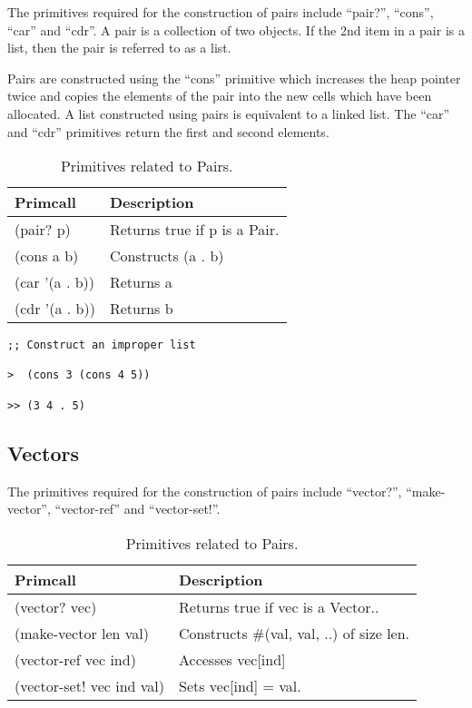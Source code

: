 \documentclass{article}
\begin{document}
The primitives required for the construction of pairs include ``pair?'', ``cons'', ``car'' and ``cdr''. A pair is a collection of two objects. If the 2nd item in a pair is a list, then the pair is referred to as a list.

Pairs are constructed using the ``cons'' primitive which increases the heap pointer twice and copies the elements of the pair into the new cells which have been allocated. A list constructed using pairs is equivalent to a linked list. The ``car'' and ``cdr'' primitives return the first and second elements.

\begin{table}[ht]
  \centering
\begin{tabular}{ l l }
  \toprule
  Primcall & Description \\ \hline
  \midrule
  (pair? p) & Returns true if p is a Pair.   \\
  (cons a b) & Constructs (a . b)  \\
  (car '(a . b)) & Returns a \\
  (cdr '(a . b)) & Returns b \\
  \bottomrule
\end{tabular}
\caption{Primitives related to Pairs.} \label{tab:pairs}
\end{table}

\begin{verbatim}
;; Construct an improper list

>  (cons 3 (cons 4 5))

>> (3 4 . 5)
\end{verbatim}


\subsection{Vectors}

The primitives required for the construction of pairs include ``vector?'', ``make-vector'', ``vector-ref'' and ``vector-set!''.

\begin{table}[ht]
  \centering
\begin{tabular}{ l l }
  \toprule
  Primcall & Description \\ \hline
  \midrule
  (vector? vec) & Returns true if vec is a Vector.. \\
  (make-vector len val) & Constructs \#(val, val, ..) of size len. \\
  (vector-ref vec ind) & Accesses vec[ind] \\
  (vector-set! vec ind val) & Sets vec[ind] = val. \\
  \bottomrule
\end{tabular}
\caption{Primitives related to Pairs.} \label{tab:vectors}
\end{table}
\end{document}
